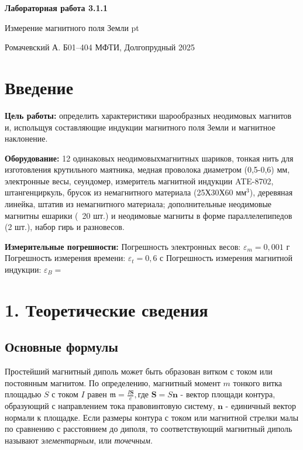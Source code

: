 \documentclass[a4paper, 12pt]{article}
\author{Александр Ромачевский}
\date{}
\begin{document}
\setcounter{secnumdepth}{0}
\thispagestyle{empty}
\begin{center}
\Huge
\textbf{Лабораторная работа 3.1.1}\newline

Измерение магнитного поля Земли
 pt

\Large\quad \quad \quad Ромачевский А. Б01--404\newline
МФТИ, Долгопрудный 2025
\end{center}
\clearpage
\newpage
\newpage

\section{Введение}

\textbf{Цель работы:}
определить характеристики шарообразных неодимовых
магнитов и, испольщуя составляющие индукции магнитного поля Земли и 
магнитное наклонение.

\textbf{Оборудование:} 12 одинаковых неодимовыхмагнитных шариков, тонкая нить для изготовления крутильного маятника, медная проволока диаметром (0,5-0,6) мм,
электронные весы, сеундомер, измеритель магнитной индукции ATE-8702, штангенциркуль, брусок из немагнитного материала (25Х30Х60 $\text{мм}^3$), деревяная линейка, штатив из немагнитного материала;
дополнительные неодимовые магнитны ешарики (~20 шт.) и неодимовые магниты в форме параллелепипедов (2 шт.), набор гирь и разновесов.

\textbf{Измерительные погрешности:}\newline
Погрешность электронных весов: $\varepsilon_m=0,001$ г\newline
Погрешность измерения времени: $\varepsilon_t=0,6$ с\newline
Погрешность измерения магнитной индукции: $\varepsilon_B=$\newline 

\newpage
\section{1. Теоретические сведения}
\subsection{Основные формулы}
Простейший магнитный диполь может быть образован витком с током или постоянным магнитом. По определению, магнитный момент $m$ тонкого витка площадью $S$ с током $I$ равен $\mathfrak{m} = \frac{I\textbf{S}}{c}, $где $\textbf{S} = S\textbf{n}$ - вектор площади контура, образующий с направлением тока правовинтовую систему, $\textbf{n}$ - единичный вектор нормали к площадке. Если размеры контура с током или магнитной стрелки малы по сравнению с расстоянием до диполя, то соответствующий магнитный диполь называют \textit{элементарным}, или \textit{точечным}.
\end{document}
